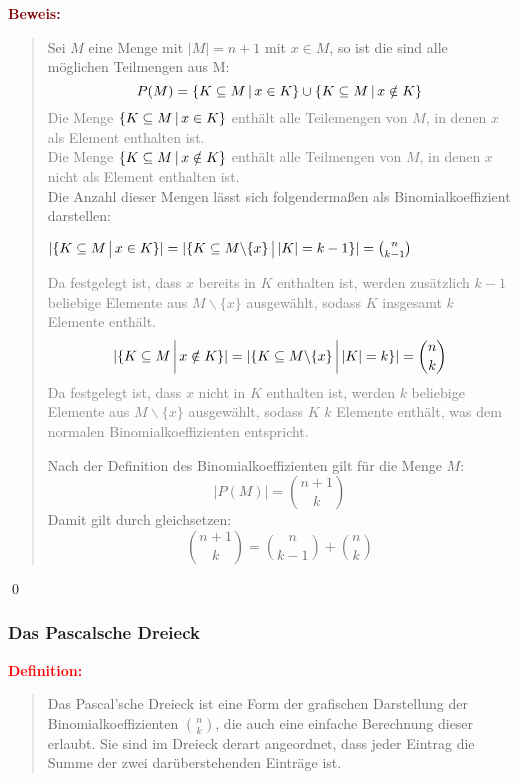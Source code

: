 \documentclass{article}
\newcommand{\smsp}{\phantom{\hspace{3px}}}
\newcommand{\red}[1]{\textcolor{red}{#1}}
\newcommand{\gray}[1]{\textcolor{gray}{#1}}
\newcommand{\maroon}[1]{\textcolor{maroon}{#1}}
\newcommand{\de}[1]{\red{\textbf{Definition: }}\begin{quote}#1\end{quote}}
\newcommand{\pr}[1]{\maroon{\textbf{Beweis: }}\begin{quote}#1\end{quote}\qed}
\newcommand{\vst}{\smsp \vline \smsp}
\begin{document}
\pr{
    Sei $M$ eine Menge mit $|M| = n + 1$ mit $x \in M$, so ist die sind alle möglichen Teilmengen aus M:
    \begin{equation*}
        P(M) = \{K \subseteq M \vst x \in K\} \cup \{K \subseteq M \vst x \notin K\}
    \end{equation*}
    \gray{Die Menge $\{K \subseteq M \vst x \in K\}$ enthält alle Teilemengen von $M$, in denen $x$ als Element enthalten ist.\\ Die Menge $\{K \subseteq M \vst x \notin K\}$ enthält alle Teilmengen von $M$, in denen $x$ nicht als Element enthalten ist.}\\
    Die Anzahl dieser Mengen lässt sich folgendermaßen als Binomialkoeffizient darstellen:
    \begin{center}
        $|\{K \subseteq M \vst x \in K\}| = |\{K \subseteq M \backslash \{x\} \vst |K| = k - 1\}| = \binom{n}{k - 1}$
    \end{center}
    \gray{Da festgelegt ist, dass $x$ bereits in $K$ enthalten ist, werden zusätzlich $k - 1$ beliebige Elemente aus $M \backslash \{x\}$ ausgewählt, sodass $K$ insgesamt $k$ Elemente enthält.}
    \begin{equation*}
        |\{K \subseteq M \vst x \notin K\}| = |\{K \subseteq M \backslash \{x\} \vst |K| = k\}| = \binom{n}{k}
    \end{equation*}
    \gray{Da festgelegt ist, dass $x$ nicht in $K$ enthalten ist, werden $k$ beliebige Elemente aus $M \backslash \{x\}$ ausgewählt, sodass $K$ $k$ Elemente enthält, was dem normalen Binomialkoeffizienten entspricht.}

    Nach der Definition des Binomialkoeffizienten gilt für die Menge $M$:
    \begin{equation*}
        |P(M)| = \binom{n + 1}{k}
    \end{equation*}
    Damit gilt durch gleichsetzen:
    \begin{equation*}
        \binom{n + 1}{k} = \binom{n}{k - 1} + \binom{n}{k}
    \end{equation*}
}

\newpage

\subsubsection{Das Pascalsche Dreieck}

\de{Das Pascal'sche Dreieck ist eine Form der grafischen Darstellung der Binomialkoeffizienten $\binom{n}{k}$, die auch eine einfache Berechnung dieser erlaubt. Sie sind im Dreieck derart angeordnet, dass jeder Eintrag die Summe der zwei darüberstehenden Einträge ist.}
\end{document}

